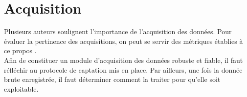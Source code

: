 \section{Acquisition}
Plusieurs auteurs soulignent l'importance de l'acquisition des données. Pour évaluer la pertinence des acquisitions, on peut se servir des métriques établies à ce propos \cite{giotWeb}.\\
Afin de constituer un module d'acquisition des données robuste et fiable, il faut réfléchir au protocole de captation mis en place. Par ailleurs, une fois la donnée brute enregistrée, il faut déterminer comment la traiter pour qu'elle soit exploitable.




